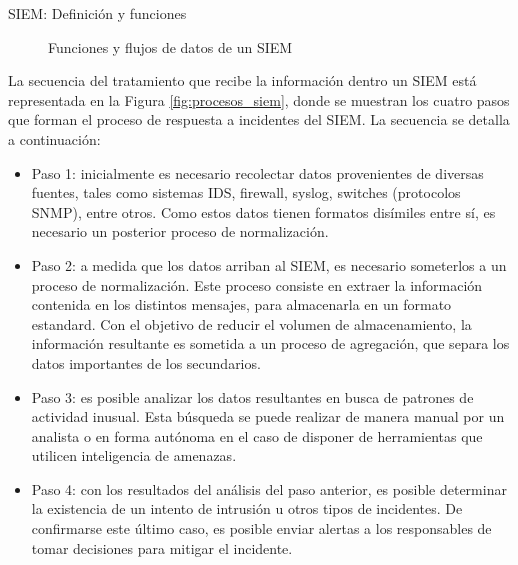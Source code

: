 \begin{section}{SIEM: Definición y funciones}
\begin{figure}[H]
            \caption{Funciones y flujos de datos de un SIEM}
            \label{fig:flujo_datos_siem}
        \end{figure}
        \FloatBarrier
        La secuencia del tratamiento que recibe la información dentro un SIEM está representada en la Figura \ref{fig:procesos_siem}, donde se muestran los cuatro pasos que forman el proceso de respuesta a incidentes del SIEM. La secuencia se detalla a continuación:
        \begin{itemize}
            \item Paso 1: inicialmente es necesario recolectar datos provenientes de diversas fuentes, tales como sistemas IDS, firewall, syslog, switches (protocolos SNMP), entre otros. Como estos datos tienen formatos disímiles entre sí, es necesario un posterior proceso de normalización.
            \item Paso 2: a medida que los datos arriban al SIEM, es necesario someterlos a un proceso de normalización. Este proceso consiste en extraer la información contenida en los distintos mensajes, para almacenarla en un formato estandard. Con el objetivo de reducir el volumen de almacenamiento, la información resultante es sometida a un proceso de agregación, que separa los datos importantes de los secundarios.
            \item Paso 3: es posible analizar los datos resultantes en busca de patrones de actividad inusual. Esta búsqueda se puede realizar de manera manual por un analista o en forma autónoma en el caso de disponer de herramientas  que utilicen inteligencia de amenazas.
            \item Paso 4:  con los resultados del análisis del paso anterior, es posible determinar la existencia de un intento de intrusión u otros tipos de incidentes. De confirmarse este último caso, es posible enviar alertas a los responsables de tomar decisiones para mitigar el incidente.
        \end{itemize}
    \begin{figure}[H]
            \centering

\end{figure}
\end{section}
